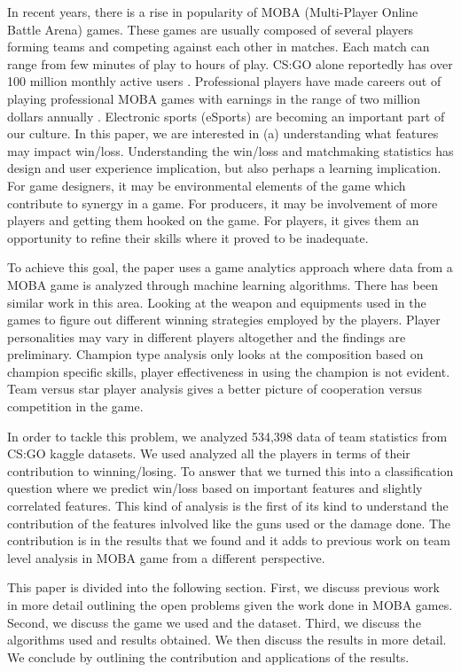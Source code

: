 \documentclass[conference]{IEEEtran}
\begin{document}
In recent years, there is a rise in popularity of MOBA (Multi-Player Online Battle Arena) games. These games are usually composed of several players forming teams and competing against each other in matches. Each match can range from few minutes of play to hours of play. CS:GO alone reportedly has over 100 million monthly active users \cite{Loterina}. Professional players have made careers out of playing professional MOBA games with earnings in the range of two million dollars annually \cite{esports}. Electronic sports (eSports) are becoming an important part of our culture. In this paper, we are interested in (a) understanding what features may impact win/loss. Understanding the win/loss and matchmaking statistics has design and user experience implication, but also perhaps a learning implication. For game designers, it may be environmental elements of the game which contribute to synergy in a game. For producers, it may be involvement of more players and getting them hooked on the game. For players, it gives them an opportunity to refine their skills where it proved to be inadequate.

To achieve this goal, the paper uses a game analytics approach where data from a MOBA game is analyzed through machine learning algorithms. There has been similar work in this area. Looking at the weapon and equipments used in the games to figure out different winning strategies employed by the players. Player personalities may vary in different players altogether and the findings are preliminary. Champion type analysis only looks at the composition based on champion specific skills, player effectiveness in using the champion is not evident. Team versus star player analysis gives a better picture of cooperation versus competition in the game.  

In order to tackle this problem, we analyzed 534,398 data of team statistics from CS:GO kaggle datasets. We used analyzed all the players in terms of their contribution to winning/losing. To answer that we turned this into a classification question where we predict win/loss based on important features and slightly correlated features. This kind of analysis is the first of its kind to understand the contribution of the features inlvolved like the guns used or the damage done. The contribution is in the results that we found and it adds to previous work on team level analysis in MOBA game from a different perspective. 

This paper is divided into the following section. First, we discuss previous work in more detail outlining the open problems given the work done in MOBA games. Second, we discuss the game we used and the dataset. Third, we discuss the algorithms used and results obtained. We then discuss the results in more detail. We conclude by outlining the contribution and applications of the results.  
\end{document}
